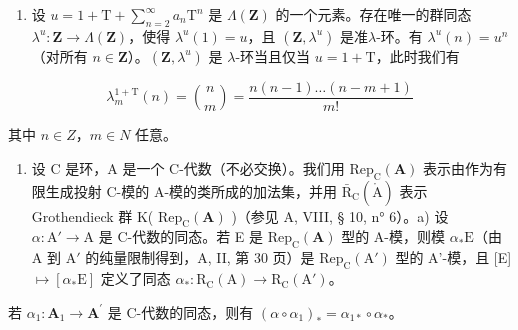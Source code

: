 \begin{enumerate}
\def\labelenumi{\arabic{enumi})}
\setcounter{enumi}{52}
\tightlist
\item
  设 \(u = 1 + \mathrm{T} + \sum_{n=2}^{\infty} a_n \mathrm{T}^n\) 是 \(\Lambda(\mathbf{Z})\) 的一个元素。存在唯一的群同态 \(\lambda^u: \mathbf{Z} \to \Lambda(\mathbf{Z})\)，使得 \(\lambda^u(1) = u\)，且 \((\mathbf{Z}, \lambda^u)\) 是准\(\lambda\)-环。有 \(\lambda^u(n) = u^n\)（对所有 \(n \in \mathbf{Z}\)）。\((\mathbf{Z}, \lambda^u)\) 是 \(\lambda\)-环当且仅当 \(u = 1 + \mathrm{T}\)，此时我们有
\end{enumerate}

\[
\lambda_ {m} ^ {1 + \mathrm{T}} (n) = \binom {n} {m} = \frac {n (n - 1) \dots (n - m + 1)}{m !}
\]

其中 \(n \in Z\)，\(m \in N\) 任意。

\begin{enumerate}
\def\labelenumi{\arabic{enumi})}
\setcounter{enumi}{53}
\tightlist
\item
  设 C 是环，A 是一个 C-代数（不必交换）。我们用 \(\mathrm{Rep}_{\mathrm{C}}(\mathbf{A})\) 表示由作为有限生成投射 C-模的 A-模的类所成的加法集，并用 \(\bar{\mathrm{R}}_{\mathrm{C}}(\mathring{\mathrm{A}})\) 表示 Grothendieck 群 K( \(\mathrm{Rep}_{\mathrm{C}}(\mathbf{A})\) )（参见 A, VIII, § 10, n° 6）。a) 设 \(\alpha : \mathrm{A}' \to \mathrm{A}\) 是 C-代数的同态。若 E 是 \(\mathrm{Rep}_{\mathrm{C}}(\mathbf{A})\) 型的 A-模，则模 \(\alpha_{*}\mathrm{E}\)（由 A 到 \(\mathrm{A}'\) 的纯量限制得到，A, II, 第 30 页）是 \(\mathrm{Rep}_{\mathrm{C}}(\mathrm{A}')\) 型的 A'-模，且 {[}E{]} \(\mapsto [\alpha_{*}\mathrm{E}]\) 定义了同态 \(\alpha_{*}: \mathrm{R}_{\mathrm{C}}(\mathrm{A}) \to \mathrm{R}_{\mathrm{C}}(\mathrm{A}')\)。
\end{enumerate}

若 \(\alpha_{1}:\mathbf{A}_{1}\to\mathbf{A}^{\prime}\) 是 C-代数的同态，则有 \((\alpha\circ\alpha_{1})_{*}=\alpha_{1*}\circ\alpha_{*}\)。

